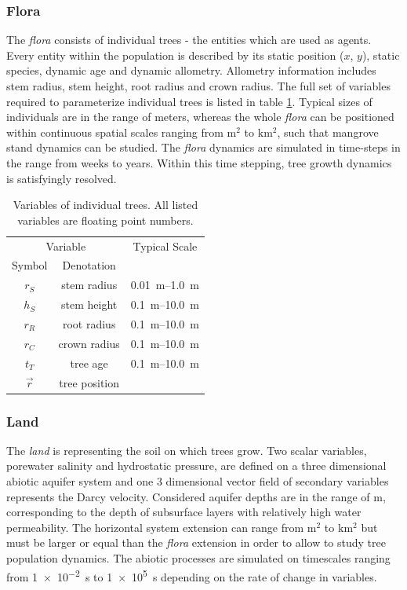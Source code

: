 \documentclass[manusscript, 12p, authoryear]{elsarticle}
\begin{document}
\subsubsection{Flora}
The \textit{flora} consists of individual trees - the entities which are used as agents.
Every entity within the population is described by its static position ($x$, $y$), static species, dynamic age and dynamic allometry.
Allometry information includes stem radius, stem height, root radius and crown radius.
The full set of variables required to parameterize individual trees is listed in table \ref{tab_bettina_variables}.
Typical sizes of individuals are in the range of meters, whereas the whole \textit{flora} can be positioned within continuous spatial scales ranging from $\mathrm{m^2}$ to $\mathrm{km^2}$, such that mangrove stand dynamics can be studied.
The \textit{flora} dynamics are simulated in time-steps in the range from weeks to years.
Within this time stepping, tree growth dynamics is satisfyingly resolved.
\begin{table}[h]
\centering
\begin{tabular}{|c|c|c|}
\hline 
\multicolumn{2}{|c|}{Variable} & Typical Scale \\
Symbol & Denotation & \\ 
\hline 
$r_S$ & stem radius  & \SIrange{0.01}{1.0}{m}  \\ 
\hline 
$h_S$ & stem height  & \SIrange{0.1}{10.0}{m}  \\ 
\hline 
$r_R$ & root radius  & \SIrange{0.1}{10.0}{m}  \\ 
\hline 
$r_C$ & crown radius  & \SIrange{0.1}{10.0}{m}  \\ 
\hline 
$t_T$ & tree age  & \SIrange{0.1}{10.0}{m} \\ 
\hline 
$\vec{r}$ & tree position  &   \\ 
\hline 
\end{tabular} 
\caption{Variables of individual trees. All listed variables are floating point numbers.}\label{tab_bettina_variables}
\end{table}
\subsubsection{Land}
The \textit{land} is representing the soil on which trees grow.
Two scalar variables, porewater salinity and hydrostatic pressure, are defined on a three dimensional abiotic aquifer system and one 3 dimensional vector field of secondary variables represents the Darcy velocity.
Considered aquifer depths are in the range of $\mathrm{m}$, corresponding to the depth of subsurface layers with relatively high water permeability.
The horizontal system extension can range from $\mathrm{m^2}$ to $\mathrm{km^2}$ but must be larger or equal than the \textit{flora} extension in order to allow to study tree population dynamics.
The abiotic processes are simulated on timescales ranging from \SI{1e-2}{s} to \SI{1e5}{s} depending on the rate of change in variables.
\end{document}
